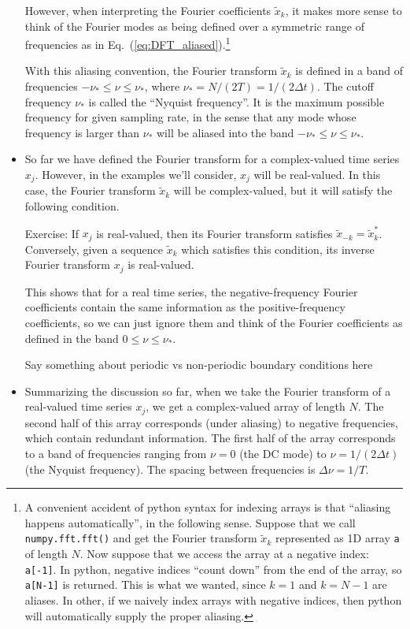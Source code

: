 \documentclass[aps,prd,superscriptaddress,groupedaddress,nofootinbib,nobibnotes]{revtex4}
\def\tx{{\tilde x}}
\begin{document}
\begin{itemize}
 However, when interpreting the Fourier coefficients $\tx_k$, it makes more sense to think of
 the Fourier modes as being defined over a symmetric range of frequencies as 
 in Eq.~(\ref{eq:DFT_aliased}).\footnote{A convenient accident of python syntax for indexing
   arrays is that ``aliasing happens automatically'', in the following sense.
   Suppose that we call {\tt numpy.fft.fft()} and get the Fourier transform $\tx_k$ represented
   as 1D array {\tt a} of length $N$.  Now suppose that we access the array at a negative index: {\tt a[-1]}.
   In python, negative indices ``count down'' from the end of the array, so {\tt a[N-1]} is returned.
   This is what we wanted, since $k=1$ and $k=N-1$ are aliases.  In other, if we naively index
   arrays with negative indices, then python will automatically supply the proper aliasing.}

 With this aliasing convention, the Fourier transform $\tx_k$ is defined in a band of frequencies 
 $-\nu_* \le \nu \le \nu_*$, where $\nu_* = N / (2 T) = 1 / (2 \Delta t)$.  
 The cutoff frequency $\nu_*$ is called the ``Nyquist frequency''.
 It is the maximum possible frequency for given sampling rate, in the sense that any mode whose
 frequency is larger than $\nu_*$ will be aliased into the band $-\nu_* \le \nu \le \nu_*$.

\item So far we have defined the Fourier transform for a complex-valued time series $x_j$.
 However, in the examples we'll consider, $x_j$ will be real-valued.  In this case, the Fourier
 transform $\tx_k$ will be complex-valued, but it will satisfy the following condition.

 Exercise: If $x_j$ is real-valued, then its Fourier transform satisfies $\tx_{-k} = \tx_k^*$.
 Conversely, given a sequence $\tx_k$ which satisfies this condition, its inverse Fourier transform
 $x_j$ is real-valued.

 This shows that for a real time series, the negative-frequency Fourier coefficients contain the same information
 as the positive-frequency coefficients, so we can just ignore them and think of the Fourier coefficients as
 defined in the band $0 \le \nu \le \nu_*$.

\item [ Say something about periodic vs non-periodic boundary conditions here ]

\item Summarizing the discussion so far, when we take the Fourier transform of a real-valued time series $x_j$,
  we get a complex-valued array of length $N$.  The second half of this array corresponds (under aliasing)
  to negative frequencies, which contain redundant information.  The first half of the array corresponds
  to a band of frequencies ranging from $\nu=0$ (the DC mode) to $\nu = 1/(2\Delta t)$ (the Nyquist frequency).
  The spacing between frequencies is $\Delta \nu = 1/T$.


\end{itemize}
\end{document}
